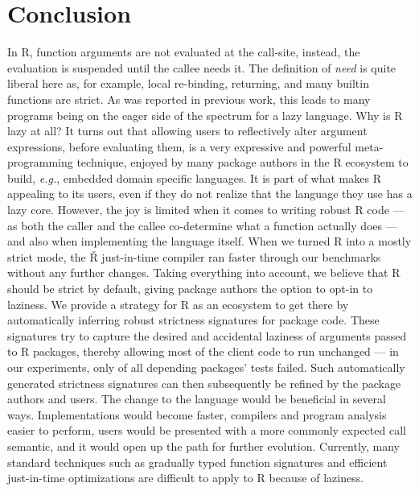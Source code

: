 \documentclass[review,creen,acmsmall]{acmart}
\renewcommand{\Rsh}{{\sf\v R}\xspace}
\newcommand{\eg}{\emph{e.g.},\xspace}
\begin{document}
\section{Conclusion}\label{sec:conclusion}

In R, function arguments are not evaluated at the call-site, instead, the
evaluation is suspended until the callee needs it. The definition of
\emph{need} is quite liberal here as, for example, local re-binding, returning,
and many builtin functions are strict. As was reported in previous work, this
leads to many programs being on the eager side of the spectrum for a lazy
language. Why is R lazy at all? It turns out that allowing users to reflectively
alter argument expressions, before evaluating them, is a very expressive and
powerful meta-programming technique, enjoyed by many package authors in the R
ecosystem to build, \eg embedded domain specific languages. It is part of
what makes R appealing to its users, even if they do not realize that the
language they use has a lazy core. However, the joy is limited when it comes to
writing robust R code --- as both the caller and the callee co-determine what a function
actually does --- and also when implementing the language itself. When we turned
R into a mostly strict mode, the \Rsh just-in-time compiler ran
\speedupRshStrict faster through our benchmarks without any further changes.
Taking everything into account, we believe that R should be strict by default,
giving package authors the option to opt-in to laziness. We provide a strategy
for R as an ecosystem to get there by automatically inferring robust strictness
signatures for package code. These signatures try to capture the desired and
accidental laziness of arguments passed to R packages, thereby allowing most of
the client code to run unchanged --- in our experiments, only \robustnesResult of
all depending packages' tests failed. Such automatically generated strictness
signatures can then subsequently be refined by the package authors and users.
The change to the language would be beneficial in several ways. Implementations
would become faster, compilers and program analysis easier to perform, users
would be presented with a more commonly expected call semantic, and it would open
up the path for further evolution. Currently, many standard techniques such as
gradually typed function signatures and efficient just-in-time optimizations are
difficult to apply to R because of laziness.


\end{document}
